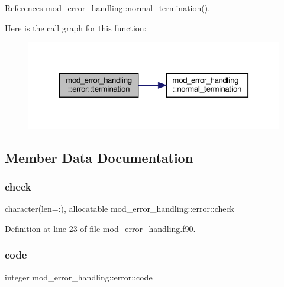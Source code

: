 References mod\+\_\+error\+\_\+handling\+::normal\+\_\+termination().

Here is the call graph for this function\+:
\nopagebreak
\begin{figure}[H]
\begin{center}
\leavevmode
\includegraphics[width=322pt]{structmod__error__handling_1_1error_a9a38f19a843710ec0b4284e29cd8f6f0_cgraph}
\end{center}
\end{figure}


\subsection{Member Data Documentation}
\mbox{\label{structmod__error__handling_1_1error_a42b62dc65492c74280602825380d6514}} 
\subsubsection{\texorpdfstring{check}{check}}
{\footnotesize\ttfamily character(len=\+:), allocatable mod\+\_\+error\+\_\+handling\+::error\+::check}



Definition at line 23 of file mod\+\_\+error\+\_\+handling.\+f90.

\mbox{\label{structmod__error__handling_1_1error_a631aa8dd70ac0884b9d71440f4811cfe}} 
\subsubsection{\texorpdfstring{code}{code}}
{\footnotesize\ttfamily integer mod\+\_\+error\+\_\+handling\+::error\+::code}



